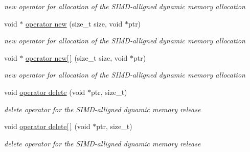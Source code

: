 \begin{DoxyCompactItemize}
\begin{DoxyCompactList}\small\item\em new operator for allocation of the S\+I\+M\+D-\/alligned dynamic memory allocation \end{DoxyCompactList}\item 
void $\ast$ \hyperlink{classKFPTrackVector_a4d6d4705f4078969c6eb7617c42ed441}{operator new} (size\+\_\+t size, void $\ast$ptr)\hypertarget{classKFPTrackVector_a4d6d4705f4078969c6eb7617c42ed441}{}\label{classKFPTrackVector_a4d6d4705f4078969c6eb7617c42ed441}

\begin{DoxyCompactList}\small\item\em new operator for allocation of the S\+I\+M\+D-\/alligned dynamic memory allocation \end{DoxyCompactList}\item 
void $\ast$ \hyperlink{classKFPTrackVector_a5eb457446d5d5cb612230da70a9a019c}{operator new\mbox{[}$\,$\mbox{]}} (size\+\_\+t size, void $\ast$ptr)\hypertarget{classKFPTrackVector_a5eb457446d5d5cb612230da70a9a019c}{}\label{classKFPTrackVector_a5eb457446d5d5cb612230da70a9a019c}

\begin{DoxyCompactList}\small\item\em new operator for allocation of the S\+I\+M\+D-\/alligned dynamic memory allocation \end{DoxyCompactList}\item 
void \hyperlink{classKFPTrackVector_a920a5723b06c936e7a249126120a97b0}{operator delete} (void $\ast$ptr, size\+\_\+t)\hypertarget{classKFPTrackVector_a920a5723b06c936e7a249126120a97b0}{}\label{classKFPTrackVector_a920a5723b06c936e7a249126120a97b0}

\begin{DoxyCompactList}\small\item\em delete operator for the S\+I\+M\+D-\/alligned dynamic memory release \end{DoxyCompactList}\item 
void \hyperlink{classKFPTrackVector_af24d8d5b3fa8db8ad424f6cb3386a981}{operator delete\mbox{[}$\,$\mbox{]}} (void $\ast$ptr, size\+\_\+t)\hypertarget{classKFPTrackVector_af24d8d5b3fa8db8ad424f6cb3386a981}{}\label{classKFPTrackVector_af24d8d5b3fa8db8ad424f6cb3386a981}

\begin{DoxyCompactList}\small\item\em delete operator for the S\+I\+M\+D-\/alligned dynamic memory release \end{DoxyCompactList}\end{DoxyCompactItemize}
